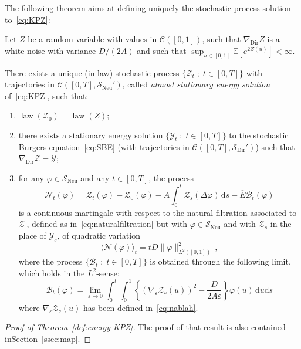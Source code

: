 \documentclass[AHL,Unicode,longabstracts]{cedram}
\DeclareMathOperator{\Dir}{Dir}
\DeclareMathOperator{\Neu}{Neu}
\DeclareMathOperator{\law}{law}
\newcommand{\bb}[1]{{\mathbb #1}}
\newcommand{\mc}[1]{{\mathcal #1}}
\renewcommand{\mc}[1]{{\mathcal #1}}
\newcommand{\SD}{\ensuremath{\mc S_{\Dir}}}
\newcommand{\SN}{\ensuremath{\mc S_{\Neu}}}
\renewcommand{\bar}{\overline}
\newcommand*{\dd}{\mathrm{d}}
\newcommand*{\ds}{\dd s}
\newcommand*{\du}{\dd u}
\begin{document}
The following theorem aims at defining uniquely the stochastic process solution to~\eqref{eq:KPZ}:

\begin{theo}\label{def:energy-KPZ}
Let $Z$ be a random variable with values in $\mc C([0,1])$, such that $\nabla_{\Dir} Z$ is a white noise with variance $D/(2A)$ and such that $\sup_{u \in [0,1]} \bb E[e^{2Z(u)}] < \infty$.

There exists a unique (in law) stochastic process $\{ \mc Z_t \; ; \; t \in [0,T]\}$ with trajectories in $\mc C([0,T],\SN')$, called \emph{almost stationary energy solution} of~\eqref{eq:KPZ}, such that:
\begin{enumerate}
\item \label{3.7.1} $\law(\mc Z_0) = \law (Z)$;

\item \label{3.7.2} there exists a stationary energy solution $\{\mc Y_t \; ; \; t \in [0,T]\}$ to the stochastic Burgers equation~\eqref{eq:SBE} (with trajectories in $\mc C([0,T],\SD')$) such that\linebreak $\nabla_{\Dir}\mc Z = \mc Y$;

\item \label{3.7.3} for any $\varphi \in \SN$ and any $t\in[0,T]$, the process
\[
\mc N_t(\varphi) = \mc Z_t(\varphi)- \mc Z_0(\varphi) - A\int_0^t \mc Z_s(\Delta \varphi)\,\ds - \bar{E} \mc B_t(\varphi)
\]
is a continuous martingale with respect to the natural filtration associated to $\mc Z_\cdot$, defined as in~\eqref{eq:naturalfiltration} but with $\varphi\in \SN$ and with $\mc Z_s$ in the place of $\mc Y_s$, of quadratic variation
\[
\big\langle \mc N(\varphi) \big\rangle_t = t D \big\| \varphi \big\|^2_{L^2([0,1])}\,,
\]
where the process $\{\mc B_t\; ; \; t\in[0,T]\}$ is obtained through the following limit, which holds in the $ L^2$-sense:
\begin{equation}\label{eq:B-def}
\mathcal{B}_t (\varphi) = \lim_{\varepsilon \to 0} \int_0^t \int_0^1 \left\{ (\nabla_{\varepsilon} \mc Z_s (u))^2 - \frac{D}{2A\varepsilon} \right\} \varphi (u) \,\du \ds
\end{equation}
where $ \nabla_{\varepsilon} \mc Z_s (u)$ has been defined in~\eqref{eq:nablah}.
\end{enumerate}
\end{theo}

\begin{proof}[Proof of Theorem~\ref{def:energy-KPZ}]
The proof of that result is also contained in\linebreak Section~\ref{ssec:map}.
\end{proof}
\end{document}
